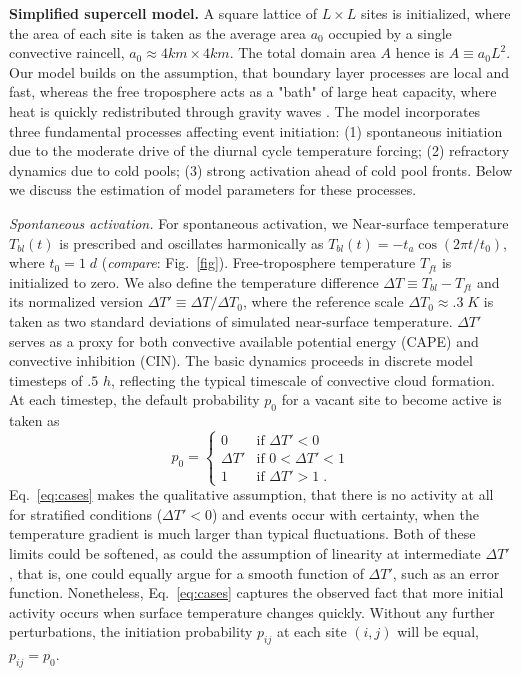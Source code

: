 \documentclass[draft,linenumbers]{agujournal2019}
\begin{document}
\noindent
{\bf Simplified supercell model.}
A square lattice of $L\times L$ sites is initialized, where the area of each site is taken as the average area $a_0$ occupied by a single convective raincell, $a_0\approx 4km\times 4km$. 
The total domain area $A$ hence is $A\equiv a_0L^2$.
Our model builds on the assumption, that boundary layer processes are local and fast, whereas the free troposphere acts as a "bath" of large heat capacity, where heat is quickly redistributed through gravity waves \cite{bretherton1989gravity}. 
The model incorporates three fundamental processes affecting event initiation: 
(1) spontaneous initiation due to the moderate drive of the diurnal cycle temperature forcing;
(2) refractory dynamics due to cold pools; 
(3) strong activation ahead of cold pool fronts.
Below we discuss the estimation of model parameters for these processes.

\noindent
{\it Spontaneous activation.}
For spontaneous activation, we 
Near-surface temperature $T_{bl}(t)$ is prescribed and oscillates harmonically as $T_{bl}(t)=-t_a \cos (2\pi t/t_0)$, where $t_0=1\;d$ ({\it compare}: Fig.~\ref{fig}).
Free-troposphere temperature $T_{ft}$ is initialized to zero.
We also define the temperature difference $\Delta T\equiv T_{bl}-T_{ft}$ and its normalized version $\Delta T'\equiv \Delta T/\Delta T_0$, where the reference scale $\Delta T_0\approx .3\;K$ is taken as two standard deviations of simulated near-surface temperature.
$\Delta T'$ serves as a proxy for both convective available potential energy (CAPE) and convective inhibition (CIN).
The basic dynamics proceeds in discrete model timesteps of $.5$ $h$, reflecting the typical timescale of convective cloud formation. 
At each timestep, the default probability $p_0$ for a vacant site to become active is taken as
\begin{equation}
p_0=\begin{cases}
0 & \text{if $\Delta T'<0$}\\
\Delta T' & \text{if $0<\Delta T'<1$}\\
1 & \text{if $\Delta T'>1$}\;.
\end{cases}
\label{eq:cases}
\end{equation}
Eq.~\ref{eq:cases} makes the qualitative assumption, that there is no activity at all for stratified conditions ($\Delta T'<0$) and events occur with certainty, when the temperature gradient is much larger than typical fluctuations. 
Both of these limits could be softened, as could the assumption of linearity at intermediate $\Delta T'$, that is, one could equally argue for a smooth function of $\Delta T'$, such as an error function. 
Nonetheless, Eq.~\ref{eq:cases} captures the observed fact that more initial activity occurs when surface temperature changes quickly.
Without any further perturbations, the initiation probability $p_{ij}$ at each site $(i,j)$ will be equal, $p_{ij}=p_0$.  
\end{document}
